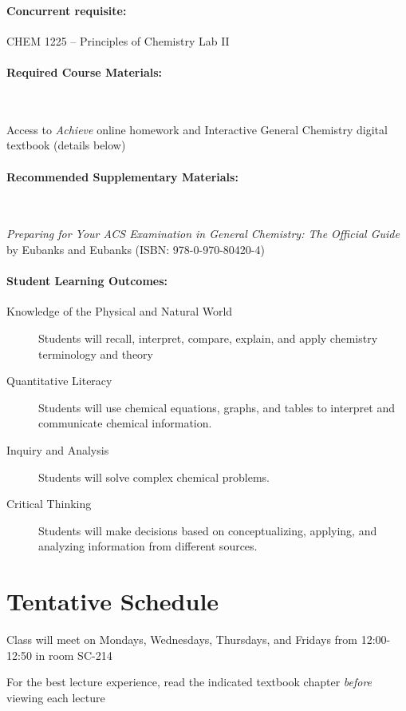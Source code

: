 \documentclass[12pt, letterpaper]{article}
\begin{document}
\paragraph{Concurrent requisite:}
CHEM 1225 -- Principles of Chemistry Lab II

\paragraph{Required Course Materials:} ~

Access to \emph{Achieve} online homework and Interactive General Chemistry digital textbook (details below)

\paragraph{Recommended Supplementary Materials:} ~

\emph{Preparing for Your ACS Examination in General Chemistry: The Official Guide} by Eubanks and Eubanks (ISBN: 978-0-970-80420-4)

\paragraph{Student Learning Outcomes:}
\begin{description}
	\item[Knowledge of the Physical and Natural World] Students will recall, interpret, compare, explain, and apply chemistry terminology and theory
	\item[Quantitative Literacy] Students will use chemical equations, graphs, and tables to interpret and communicate chemical information.
	\item[Inquiry and Analysis] Students will solve complex chemical problems.
	\item[Critical Thinking] Students will make decisions based on conceptualizing, applying, and analyzing information from different sources.
\end{description}

\section*{Tentative Schedule}
Class will meet on Mondays, Wednesdays, Thursdays, and Fridays from 12:00-12:50 in room SC-214

\noindent For the best lecture experience, read the indicated textbook chapter \emph{before} viewing each lecture
\end{document}
